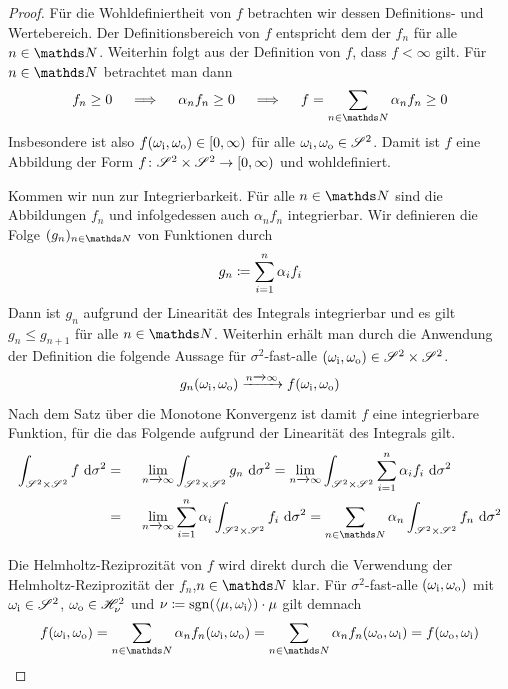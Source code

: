 		\begin{proof}
			Für die Wohldefiniertheit von $f$ betrachten wir dessen Definitions- und Wertebereich.
			Der Definitionsbereich von $f$ entspricht dem der $f_n$ für alle $n\in\SN$.
			Weiterhin folgt aus der Definition von $f$, dass $f < \infty$  gilt.
			Für $n\in\SN$ betrachtet man dann
			\[
				f_n \geq 0 \quad \implies \quad \alpha_n f_n \geq 0 \quad \implies \quad f = \sum_{n\in\SN}\alpha_n f_n \geq 0
			\]
			Insbesondere ist also $f(\omega_{\mathrm{i}},\omega_{\mathrm{o}})\in[0,\infty)$ für alle $\omega_{\mathrm{i}},\omega_{\mathrm{o}}\in\mathscr{S}^{2}$.
			Damit ist $f$ eine Abbildung der Form $f\colon\mathscr{S}^{2}\times\mathscr{S}^{2}\to[0,\infty)$ und wohldefiniert.

			Kommen wir nun zur Integrierbarkeit.
			Für alle $n\in\SN$ sind die Abbildungen $f_n$ und infolgedessen auch $\alpha_nf_n$ integrierbar.
			Wir definieren die Folge $(g_n)_{n\in\SN}$ von Funktionen durch
			\[
				g_n\coloneqq \sum_{i=1}^n \alpha_i f_i
			\]
			Dann ist $g_n$ aufgrund der Linearität des Integrals integrierbar und es gilt $g_n\leq g_{n+1}$ für alle $n\in\SN$.
			Weiterhin erhält man durch die Anwendung der Definition die folgende Aussage für $\sigma^2$-fast-alle $(\omega_{\mathrm{i}},\omega_{\mathrm{o}})\in\mathscr{S}^{2}\times\mathscr{S}^{2}$.
			\[
				g_n(\omega_{\mathrm{i}},\omega_{\mathrm{o}}) \xrightarrow[]{n\xrightarrow[]{}\infty} f(\omega_{\mathrm{i}},\omega_{\mathrm{o}})
			\]
			Nach dem Satz über die Monotone Konvergenz \cite[S.~125]{measure-theory} ist damit $f$ eine integrierbare Funktion, für die das Folgende aufgrund der Linearität des Integrals gilt.
			\begin{alignat*}{3}
				\integral{\ssp\times\ssp}{}{f}{\sigma^2} &=&&\ \lim_{n\conv\infty} \integral{\ssp\times\ssp}{}{g_n}{\sigma^2} = \lim_{n\conv\infty} \integral{\ssp\times\ssp}{}{\sum_{i=1}^n \alpha_i f_i}{\sigma^2} \\
				&=&&\ \lim_{n\conv\infty} \sum_{i=1}^n \alpha_i \integral{\ssp\times\ssp}{}{f_i}{\sigma^2} = \sum_{n\in\SN} \alpha_n \integral{\ssp\times\ssp}{}{f_n}{\sigma^2}
			\end{alignat*}

			Die Helmholtz-Reziprozität von $f$ wird direkt durch die Verwendung der Helmholtz-Reziprozität der $f_n$,$n\in\SN$ klar.
			Für $\sigma^2$-fast-alle $(\omega_{\mathrm{i}},\omega_{\mathrm{o}})$ mit $\omega_{\mathrm{i}}\in\mathscr{S}^{2}$, $\omega_{\mathrm{o}}\in\mathscr{H}^{2}_{\nu}$ und $\nu\coloneqq\operatorname{sgn}(\left\langle \mu,\omega_{\mathrm{i}} \right\rangle)\cdot\mu$ gilt demnach
			\[
				f(\omega_\m{i},\omega_\m{o}) = \sum_{n\in\SN}\alpha_nf_n(\omega_\m{i},\omega_\m{o}) = \sum_{n\in\SN}\alpha_nf_n(\omega_\m{o},\omega_\m{i}) = f(\omega_\m{o},\omega_\m{i})
			\]


\end{proof}
